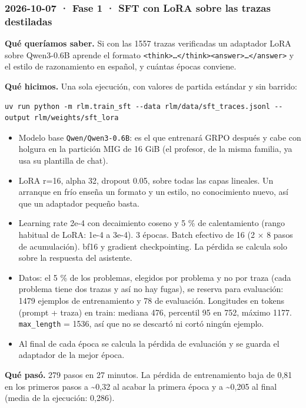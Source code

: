 \subsubsection{2026-10-07 · Fase 1 · SFT con LoRA sobre las trazas destiladas}

\textbf{Qué queríamos saber.} Si con las 1557 trazas verificadas un adaptador LoRA sobre
Qwen3-0.6B aprende el formato \texttt{\textless{}think\textgreater{}…\textless{}/\allowbreak{}think\textgreater{}\textless{}answer\textgreater{}…\textless{}/\allowbreak{}answer\textgreater{}} y el estilo de razonamiento
en español, y cuántas épocas conviene.

\textbf{Qué hicimos.} Una sola ejecución, con valores de partida estándar y sin barrido:

\begin{lstlisting}
uv run python -m rlm.train_sft --data rlm/data/sft_traces.jsonl --output rlm/weights/sft_lora
\end{lstlisting}

\begin{itemize}
\tightlist
\item
  Modelo base \texttt{Qwen/\allowbreak{}Qwen3-0.6B}: es el que entrenará GRPO después y cabe con holgura en la
  partición MIG de 16 GiB (el profesor, de la misma familia, ya usa su plantilla de chat).
\item
  LoRA r=16, alpha 32, dropout 0.05, sobre todas las capas lineales. Un arranque en frío enseña
  un formato y un estilo, no conocimiento nuevo, así que un adaptador pequeño basta.
\item
  Learning rate 2e-4 con decaimiento coseno y 5 \% de calentamiento (rango habitual de LoRA:
  1e-4 a 3e-4). 3 épocas. Batch efectivo de 16 (2 × 8 pasos de acumulación). bf16 y
  gradient checkpointing. La pérdida se calcula solo sobre la respuesta del asistente.
\item
  Datos: el 5 \% de los problemas, elegidos por problema y no por traza (cada problema tiene
  dos trazas y así no hay fugas), se reserva para evaluación: 1479 ejemplos de entrenamiento y
  78 de evaluación. Longitudes en tokens (prompt + traza) en train: mediana 476, percentil 95 en
  752, máximo 1177. \texttt{max\_\allowbreak{}length} = 1536, así que no se descartó ni cortó ningún ejemplo.
\item
  Al final de cada época se calcula la pérdida de evaluación y se guarda el adaptador de la
  mejor época.
\end{itemize}

\textbf{Qué pasó.} 279 pasos en 27 minutos. La pérdida de entrenamiento baja de 0,81 en los primeros
pasos a \textasciitilde0,32 al acabar la primera época y a \textasciitilde0,205 al final (media de la ejecución: 0,286).

